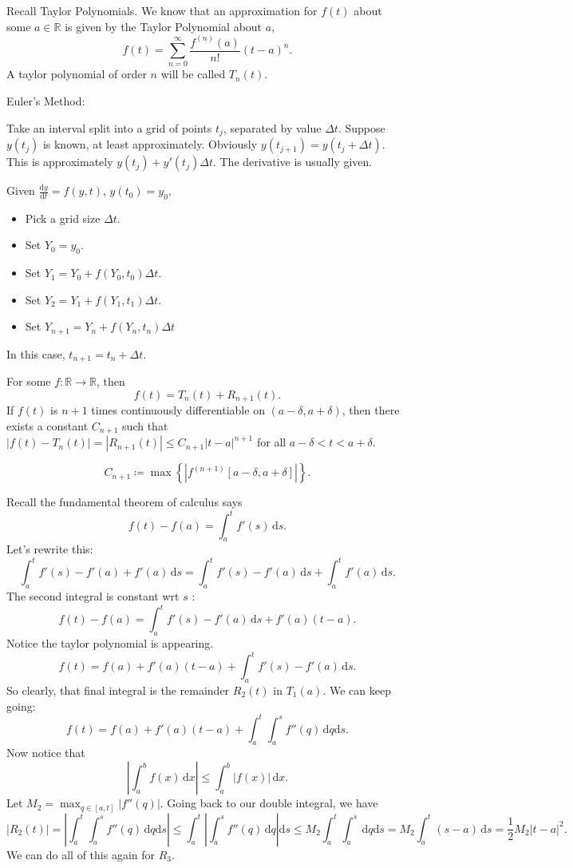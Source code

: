 Recall Taylor Polynomials. We know that an approximation for $f(t)$ about some $a\in\mathbb{R}$ is given by the Taylor Polynomial about $a$,
\[
	f(t)=\sum_{n=0}^{\infty} \frac{f^{(n)}(a)}{n!}(t-a)^n
.\]
A taylor polynomial of order $n$ will be called $T_n(t)$.
\begin{prev}
	Euler's Method:

	Take an interval split into a grid of points $t_j$, separated by value $\Delta t$. Suppose $y(t_j)$ is known, at least approximately. Obviously $y(t_{j+1})=y(t_j+\Delta t)$. This is approximately $y(t_j)+y'(t_j)\Delta t$. The derivative is usually given.

	Given $\frac{\mathrm{d}y}{\mathrm{d}t} =f(y,t)$, $y(t_0)=y_0$,
	\begin{itemize}
		\item Pick a grid size $\Delta t$.
		\item Set $Y_0=y_0$.
		\item Set $Y_1=Y_0+f(Y_0,t_0)\Delta t$.
		\item Set $Y_2=Y_1+f(Y_1,t_1)\Delta t$.
		\item Set $Y_{n+1}=Y_n+f(Y_n,t_n)\Delta t$
	\end{itemize}
	In this case, $t_{n+1}=t_n+\Delta t$.
\end{prev}
\begin{theorem}\label{thm:3}
	For some $f : \mathbb{R} \to \mathbb{R}$, then
	\[
		f(t)=T_n(t)+R_{n+1}(t)
	.\]
	If $f(t)$ is $n+1$ times continuously differentiable on $\left( a-\delta ,a+\delta  \right) $, then there exists a constant $C_{n+1}$ such that $|f(t)-T_n(t)|=\left| R_{n+1}(t) \right| \leq C_{n+1}\left| t-a \right| ^{n+1}$ for all $a-\delta <t<a+\delta $.

	\[C_{n+1}\coloneqq \max \left\{ \left| f^{(n+1)}[a-\delta ,a+\delta]  \right|\right\} .\]
\end{theorem}
Recall the fundamental theorem of calculus says
\[
	f(t)-f(a)=\int_{a}^{t} f'(s) \,\mathrm{d} s
.\]
Let's rewrite this:
\[
	\int_{a}^{t} f'(s)-f'(a)+f'(a) \,\mathrm{d} s=\int_{a}^{t} f'(s)-f'(a) \,\mathrm{d} s+\int_{a}^{t} f'(a) \,\mathrm{d} s
.\]
The second integral is constant wrt $s$ :
\[
	f(t)-f(a)=\int_{a}^{t} f'(s)-f'(a) \,\mathrm{d} s+f'(a)(t-a)
.\]
Notice the taylor polynomial is appearing.
\[
	f(t)=f(a)+f'(a)(t-a)+\int_{a}^{t} f'(s)-f'(a) \,\mathrm{d} s
.\]
So clearly, that final integral is the remainder $R_2(t)$ in $T_1(a)$. We can keep going:
\[
	f(t)=f(a)+f'(a)(t-a)+\int_{a}^{t}\int_{a}^{s} f''(q) \,\mathrm{d} q \mathrm{d} s
.\]
Now notice that
\[
	\left| \int_{a}^{b} f(x) \,\mathrm{d}x  \right| \leq \int_{a}^{b} \left| f(x) \right|  \,\mathrm{d} x
.\]
Let $M_2 = \max_{q\in[a,t]}\left| f''(q) \right|$.
Going back to our double integral, we have
\[
	\left| R_2(t) \right| =\left| \int_{a}^{t}\int_{a}^{s} f''(q) \,\mathrm{d} q \mathrm{d} s \right| \leq \int_{a}^{t}\left|\int_{a}^{s} f''(q) \,\mathrm{d} q \right|\mathrm{d} s \leq M_2\int_{a}^{t}\int_{a}^{s}  \,\mathrm{d} q \mathrm{d}s =M_2 \int_{a}^{t} (s-a) \,\mathrm{d} s=\frac{1}{2}M_2 \left| t-a \right|^2
.\]
We can do all of this again for $R_3$.
